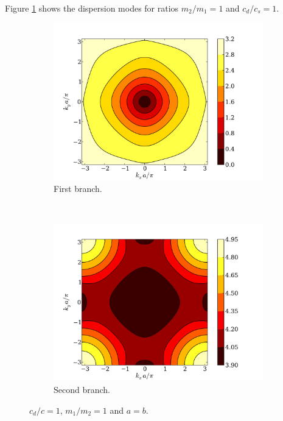 \documentclass[12pt,letterpaper]{article}
\begin{document}
Figure \ref{fig:square-bcc-disp} shows the dispersion modes for ratios $m_2/m_1=1$ and $c_d/c_s=1$.
\begin{figure}[h]
        \centering
        \begin{subfigure}[b]{0.49\textwidth}
                \includegraphics[width=\textwidth]{img/square-bcc-disp1-c=1-m=1.pdf}\caption{First branch.}
        \end{subfigure}\,
%
        \begin{subfigure}[b]{0.49\textwidth}
                \includegraphics[width=\textwidth]{img/square-bcc-disp2-c=1-m=1.pdf}\caption{Second branch.}
         \end{subfigure}
 \caption{$c_d/c = 1$, $m_1/m_2=1$ and $a=b$.}\label{fig:square-bcc-disp}
\end{figure}
\end{document}
